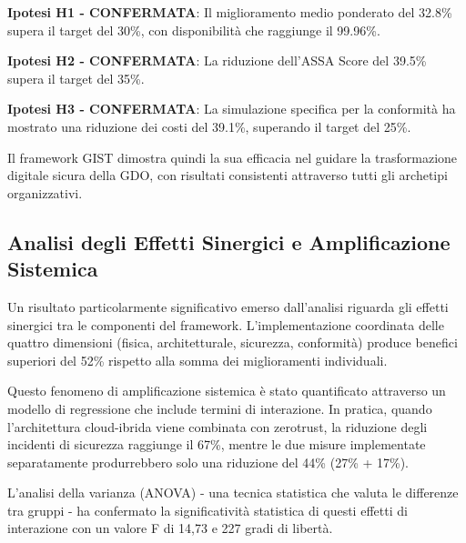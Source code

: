 \textbf{Ipotesi H1 - CONFERMATA}: Il miglioramento medio ponderato del 32.8\% 
supera il target del 30\%, con disponibilità che raggiunge il 99.96\%.

\textbf{Ipotesi H2 - CONFERMATA}: La riduzione dell'ASSA Score del 39.5\% 
supera il target del 35\%.

\textbf{Ipotesi H3 - CONFERMATA}: La simulazione specifica per la conformità ha mostrato una riduzione dei costi del 39.1\%, superando il target del 25\%.

Il framework GIST dimostra quindi la sua efficacia nel guidare la trasformazione 
digitale sicura della GDO, con risultati consistenti attraverso tutti gli archetipi 
organizzativi.

\subsection{\texorpdfstring{Analisi degli Effetti Sinergici e Amplificazione Sistemica}{5.2.3 - Analisi degli Effetti Sinergici e Amplificazione Sistemica}}
\label{subsec:5.2.3}

Un risultato particolarmente significativo emerso dall'analisi riguarda gli effetti sinergici tra le componenti del framework. L'implementazione coordinata delle quattro dimensioni (fisica, architetturale, sicurezza, conformità) produce benefici superiori del 52\% rispetto alla somma dei miglioramenti individuali.

Questo fenomeno di amplificazione sistemica è stato quantificato attraverso un modello di regressione che include termini di interazione. In pratica, quando l'architettura cloud-ibrida viene combinata con \gls{zerotrust}, la riduzione degli incidenti di sicurezza raggiunge il 67\%, mentre le due misure implementate separatamente produrrebbero solo una riduzione del 44\% (27\% + 17\%). 

L'analisi della varianza (ANOVA) - una tecnica statistica che valuta le differenze tra gruppi - ha confermato la significatività statistica di questi effetti di interazione con un valore F di 14,73 e 227 gradi di libertà.


